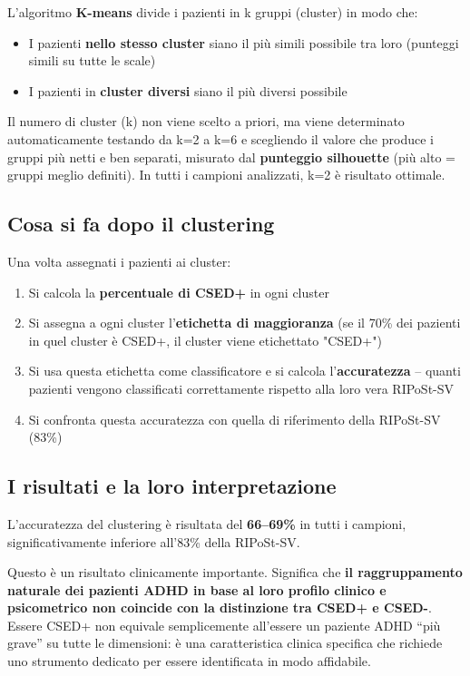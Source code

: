 \documentclass[12pt, a4paper]{article}
\begin{document}
L'algoritmo \textbf{K-means} divide i pazienti in k gruppi (cluster) in modo che:
\begin{itemize}
    \item I pazienti \textbf{nello stesso cluster} siano il più simili possibile tra loro
          (punteggi simili su tutte le scale)
    \item I pazienti in \textbf{cluster diversi} siano il più diversi possibile
\end{itemize}

Il numero di cluster (k) non viene scelto a priori, ma viene determinato automaticamente
testando da k=2 a k=6 e scegliendo il valore che produce i gruppi più netti e ben separati,
misurato dal \textbf{punteggio silhouette} (più alto = gruppi meglio definiti). In tutti i
campioni analizzati, k=2 è risultato ottimale.

\subsection{Cosa si fa dopo il clustering}

Una volta assegnati i pazienti ai cluster:

\begin{enumerate}
    \item Si calcola la \textbf{percentuale di CSED+} in ogni cluster
    \item Si assegna a ogni cluster l'\textbf{etichetta di maggioranza} (se il 70\% dei
          pazienti in quel cluster è CSED+, il cluster viene etichettato "CSED+")
    \item Si usa questa etichetta come classificatore e si calcola l'\textbf{accuratezza} --
          quanti pazienti vengono classificati correttamente rispetto alla loro vera RIPoSt-SV
    \item Si confronta questa accuratezza con quella di riferimento della RIPoSt-SV (83\%)
\end{enumerate}

\subsection{I risultati e la loro interpretazione}

L'accuratezza del clustering è risultata del \textbf{66--69\%} in tutti i campioni,
significativamente inferiore all'83\% della RIPoSt-SV.

Questo è un risultato clinicamente importante. Significa che \textbf{il raggruppamento
naturale dei pazienti ADHD in base al loro profilo clinico e psicometrico non coincide con
la distinzione tra CSED+ e CSED-}. Essere CSED+ non equivale semplicemente all'essere un
paziente ADHD ``più grave'' su tutte le dimensioni: è una caratteristica clinica specifica
che richiede uno strumento dedicato per essere identificata in modo affidabile.
\end{document}

